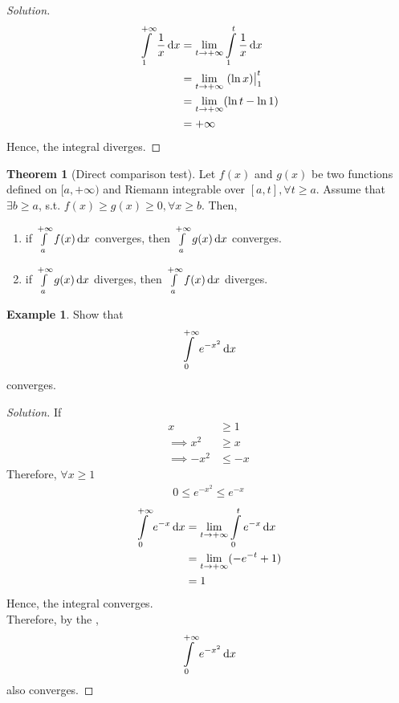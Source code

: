 \documentclass[fleqn, a4paper, 12pt]{article}
\theoremstyle{definition}
\newtheorem{example}{Example}
\theoremstyle{theorem}
\newtheorem{theorem}{Theorem}
\theoremstyle{remark}
\newenvironment{solution}
{\begin{proof}[Solution]\let\qed\relax}
	{\end{proof}}
\begin{document}
\begin{solution}
	\begin{align*}
		\int\limits_{1}^{+\infty}\dfrac{1}{x} \dif x &= \lim\limits_{t \to +\infty} \int\limits_{1}^{t} \dfrac{1}{x} \dif x\\
		&= \lim\limits_{t \to +\infty} \left. (\ln x) \right\rvert_{1}^{t}\\
		&= \lim\limits_{t \to +\infty} (\ln t - \ln 1)\\
		&= +\infty
	\end{align*}
	Hence, the integral diverges.
\end{solution}

\begin{theorem}[Direct comparison test]\label{Direct comparison test}
	Let $f(x)$ and $g(x)$ be two functions defined on $[a, +\infty)$ and Riemann integrable over $[a, t], \forall t \geq a$. Assume that $\exists b \geq a$, s.t. $f(x) \geq g(x) \geq 0, \forall x \geq b$. Then,
	\begin{enumerate}
		\item if $\int\limits_{a}^{+\infty} f(x) \dif x$ converges, then $\int\limits_{a}^{+\infty} g(x) \dif x$ converges.
		\item if $\int\limits_{a}^{+\infty} g(x) \dif x$ diverges, then $\int\limits_{a}^{+\infty} f(x) \dif x$ diverges.
	\end{enumerate}
\end{theorem}

\begin{example}
	Show that \[\int\limits_{0}^{+\infty} e^{-x^2} \dif x\]	converges.
\end{example}

\begin{solution}
	If
	\begin{align*}
		x &\geq 1\\
		\implies x^2 &\geq x\\
		\implies -x^2 &\leq -x
	\end{align*}
	Therefore, $\forall x \geq 1$
	\begin{align*}
		0 \leq e^{-x^2} \leq e^{-x}
	\end{align*}
	\begin{align*}
		\int\limits_{0}^{+\infty} e^{-x} \dif x &= \lim\limits_{t \to +\infty} \int\limits_{0}^{t} e^{-x} \dif x\\
		&= \lim\limits_{t \to +\infty} (-e^{-t} + 1)\\
		&= 1
	\end{align*}
	Hence, the integral converges.\\
	Therefore, by the , 
	\[\int\limits_{0}^{+\infty} e^{-x^2} \dif x\] also converges.
\end{solution}
\end{document}
